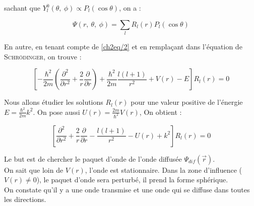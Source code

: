 \documentclass[12pt,a4paper,oneside,french]{book}
\theoremstyle{definition}
\theoremstyle{definition}
\theoremstyle{definition}
\theoremstyle{remark}
\theoremstyle{definition}
\begin{document}
    sachant que ${Y}_{l}^{0}(\theta, \ \phi) \propto {P}_{l}(\cos{\theta})$, on a :
    
    \begin{equation*}
        \Psi(r, \ \theta, \ \phi) = \sum_{l} {R}_{l}(r) {P}_{l}(\cos{\theta})
    \end{equation*}
    
    En autre, en tenant compte de \eqref{ch2eq/2} et en remplaçant dans l'équation de \textsc{Schrödinger}, on trouve :
    
    \begin{equation*}
        \left[-\frac{{\hbar}^{2}}{2 m} \left(\frac{{\partial}^{2}}{\partial {r}^{2}} + \frac{2}{r} \frac{\partial}{\partial r}\right) + \frac{{\hbar}^{2}}{2 m} \frac{l(l + 1)}{{r}^{2}} + V(r) - E\right] {R}_{l}(r) = 0
    \end{equation*}
    
    Nous allons étudier les solutions ${R}_{l}(r)$ pour une valeur positive de l'énergie $E = \frac{{\hbar}^{2}}{2 m} {k}^{2}$. On pose aussi $U(r) = \frac{2 m}{{\hbar}^{2}} V(r)$, On obtient :
    
    \begin{equation*}
        \left[\frac{{\partial}^{2}}{\partial {r}^{2}} + \frac{2}{r} \frac{\partial}{\partial r} - \frac{l(l + 1)}{{r}^{2}} - U(r) + {k}^{2}\right] {R}_{l}(r) = 0
    \end{equation*}
    
    Le but est de chercher le paquet d'onde de l'onde diffusée ${\Psi}_{dif}(\vec{r})$. \\
    
    On sait que loin de $V(r)$, l'onde est stationnaire. Dans la zone d'influence ($V(r) \neq 0$), le paquet d'onde sera perturbé, il prend la forme sphérique. \\
    
    On constate qu'il y a une onde transmise et une onde qui se diffuse dans toutes les directions.
    
\end{document}
